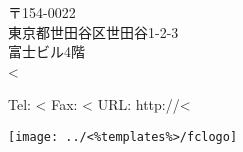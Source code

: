 \parbox[t]{.60\textwidth}{
\vspace{0.3cm}
        {〒154-0022 \\
        東京都世田谷区世田谷1-2-3 \\
        富士ビル4階 \\
        <%
        }
}
\parbox[t]{.30\textwidth}{
\vspace{0.3cm}
        {Tel: <%
        Fax: <%
        URL: http://<%
        }
}
\parbox[t]{.10\textwidth}{
\vspace{0.2cm}
   \texttt{[image: ../<\%templates\%>/fclogo]}
}
